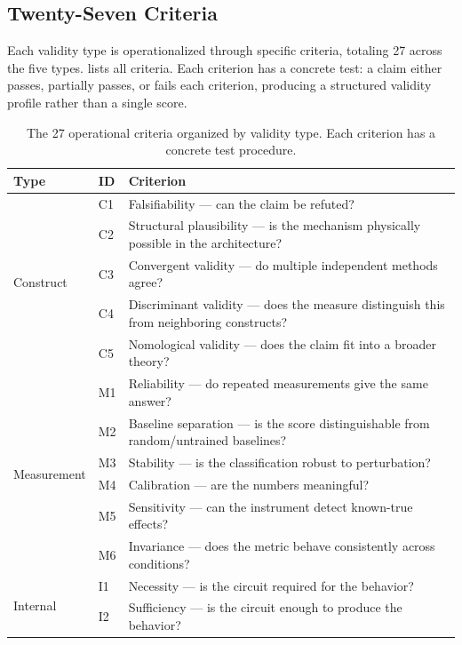 \documentclass[10pt]{article}
\newcommand{\tighttable}{\setlength{\tabcolsep}{4pt}\renewcommand{\arraystretch}{1.05}}
\begin{document}
\subsection{Twenty-Seven Criteria}
\label{sec:criteria}

Each validity type is operationalized through specific criteria, totaling 27 across the five types.  lists all criteria. Each criterion has a concrete test: a claim either passes, partially passes, or fails each criterion, producing a structured validity profile rather than a single score.

\begin{table}[t]
\centering
\tighttable
\caption{The 27 operational criteria organized by validity type. Each criterion has a concrete test procedure.}
\label{tab:criteria}
\small
\begin{tabular}{@{}llp{6.5cm}@{}}
\toprule
\textbf{Type} & \textbf{ID} & \textbf{Criterion} \\
\midrule
\multirow{5}{*}{Construct} & C1 & Falsifiability --- can the claim be refuted? \\
& C2 & Structural plausibility --- is the mechanism physically possible in the architecture? \\
& C3 & Convergent validity --- do multiple independent methods agree? \\
& C4 & Discriminant validity --- does the measure distinguish this from neighboring constructs? \\
& C5 & Nomological validity --- does the claim fit into a broader theory? \\
\midrule
\multirow{6}{*}{Measurement} & M1 & Reliability --- do repeated measurements give the same answer? \\
& M2 & Baseline separation --- is the score distinguishable from random/untrained baselines? \\
& M3 & Stability --- is the classification robust to perturbation? \\
& M4 & Calibration --- are the numbers meaningful? \\
& M5 & Sensitivity --- can the instrument detect known-true effects? \\
& M6 & Invariance --- does the metric behave consistently across conditions? \\
\midrule
\multirow{5}{*}{Internal} & I1 & Necessity --- is the circuit required for the behavior? \\
& I2 & Sufficiency --- is the circuit enough to produce the behavior? \\

\end{tabular}
\end{table}
\end{document}
